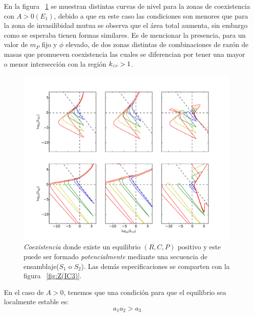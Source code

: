 En la figura  ~\ref{fig:PSCoexistence} se muestran distintas curvas de nivel para la zonas de coexistencia con $A > 0(E_1)$, debido a que en este caso las condiciones son menores que para la zona de invasilibidad mutua se observa que el \'area total aumenta, sin embargo como se esperaba tienen formas similares. Es de mencionar la presencia, para un valor de $m_P$ fijo y $\phi$ elevado, de dos zonas distintas de combinaciones de raz\'on de masas que promueven coexistencia las cuales se diferencian por tener una mayor o menor intersecci\'on con la regi\'on $k_{\textit{\tiny CP}} > 1$. \\

\begin{figure}[!htbp]
  \centering
  \includegraphics[width = 0.99\textwidth]{./Plots/CoexistenceAcGrGr.pdf}
  \caption[Env $Coexistencia$]{\emph{Coexistencia} donde existe un equilibrio $(R,C,P)$ positivo y este puede ser formado \emph{potencialmente} mediante una secuencia de ensamblaje($S_1$ o $S_2$). Las dem\'as especificaciones se comparten con la figura ~\ref{fig:Z(IC3)}.}
  \label{fig:PSCoexistence}
\end{figure}

En el caso de $ A > 0 $, tenemos que una condici\'on para que el equilibrio sea localmente estable es:
\begin{equation}
  a_1 a_2 > a_3
\end{equation}


